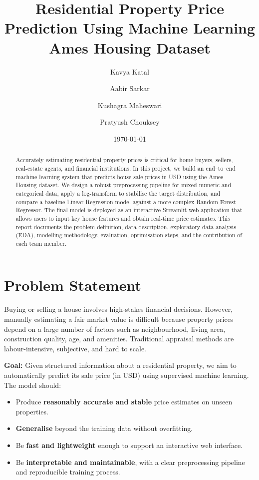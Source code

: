 \documentclass[11pt,a4paper]{article}
\title{\textbf{Residential Property Price Prediction Using Machine Learning}\\[4pt]
\large Ames Housing Dataset}
\author{
Kavya Katal \and
Aabir Sarkar \and
Kushagra Maheswari \and
Pratyush Chouksey
}
\date{\today}
\begin{document}
\maketitle

\onehalfspacing

\begin{abstract}
Accurately estimating residential property prices is critical for home buyers, sellers, real-estate agents, and financial institutions. 
In this project, we build an end--to--end machine learning system that predicts house sale prices in USD using the Ames Housing dataset.
We design a robust preprocessing pipeline for mixed numeric and categorical data, apply a log-transform to stabilise the target distribution, and compare a baseline Linear Regression model against a more complex Random Forest Regressor.
The final model is deployed as an interactive Streamlit web application that allows users to input key house features and obtain real-time price estimates.
This report documents the problem definition, data description, exploratory data analysis (EDA), modelling methodology, evaluation, optimisation steps, and the contribution of each team member.
\end{abstract}

\tableofcontents
\newpage

\section{Problem Statement}

Buying or selling a house involves high-stakes financial decisions.
However, manually estimating a fair market value is difficult because property prices depend on a large number of factors such as neighbourhood, living area, construction quality, age, and amenities.
Traditional appraisal methods are labour-intensive, subjective, and hard to scale.

\textbf{Goal:}
Given structured information about a residential property, we aim to automatically predict its sale price (in USD) using supervised machine learning.
The model should:

\begin{itemize}[leftmargin=*]
    \item Produce \textbf{reasonably accurate and stable} price estimates on unseen properties.
    \item \textbf{Generalise} beyond the training data without overfitting.
    \item Be \textbf{fast and lightweight} enough to support an interactive web interface.
    \item Be \textbf{interpretable and maintainable}, with a clear preprocessing pipeline and reproducible training process.
\end{itemize}
\end{document}
